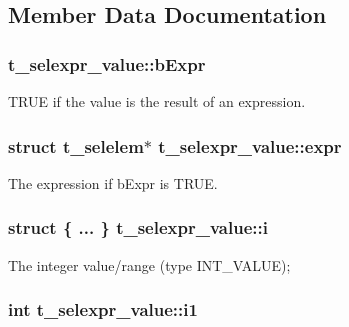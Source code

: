 \subsection{\-Member \-Data \-Documentation}
\hypertarget{structt__selexpr__value_a9633665bd1927339d3fdf2dc119759d2}{
\subsubsection[{b\-Expr}]{ {\bf t\-\_\-selexpr\-\_\-value\-::b\-Expr}}}\label{structt__selexpr__value_a9633665bd1927339d3fdf2dc119759d2}
\-T\-R\-U\-E if the value is the result of an expression. \hypertarget{structt__selexpr__value_a52e17a378d26bfc77f850aa9e233b396}{
\subsubsection[{expr}]{\setlength{\rightskip}{0pt plus 5cm}struct {\bf t\-\_\-selelem}$\ast$ {\bf t\-\_\-selexpr\-\_\-value\-::expr}}}\label{structt__selexpr__value_a52e17a378d26bfc77f850aa9e233b396}
\-The expression if {\ttfamily b\-Expr} is \-T\-R\-U\-E. \hypertarget{structt__selexpr__value_ac0a533beb7e085f510541083ec1ae8a7}{
\subsubsection[{i}]{\setlength{\rightskip}{0pt plus 5cm}struct \{ ... \}                     {\bf t\-\_\-selexpr\-\_\-value\-::i}}}\label{structt__selexpr__value_ac0a533beb7e085f510541083ec1ae8a7}
\-The integer value/range ({\ttfamily type} \-I\-N\-T\-\_\-\-V\-A\-L\-U\-E); \hypertarget{structt__selexpr__value_a9baf2eb4536a8ef57cc2de45acf1a490}{
\subsubsection[{i1}]{\setlength{\rightskip}{0pt plus 5cm}int {\bf t\-\_\-selexpr\-\_\-value\-::i1}}}\label{structt__selexpr__value_a9baf2eb4536a8ef57cc2de45acf1a490}
